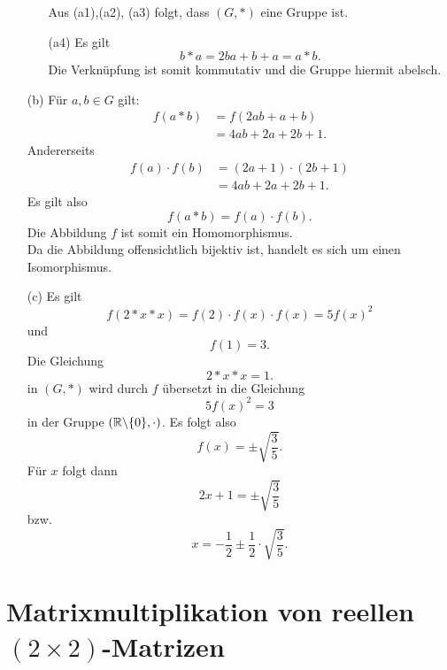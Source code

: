 \documentclass[
				a4paper,
				10pt
			]
			{scrartcl}
\begin{document}
\begin{itemize}
\begin{itemize}
					Aus (a1),(a2), (a3) folgt, dass $(G,\ast)$ eine Gruppe ist.
			\item[(a4)] Es gilt
					$$
						b\ast a = 2ba + b + a = a \ast b.
					$$
					Die Verkn\"upfung ist somit kommutativ und die Gruppe hiermit abelsch.
		\end{itemize}
		
		\item[(b)]
			F\"ur $a,b \in G$ gilt:
			\begin{align*}
				f(a\ast b)	&=	f(2ab+a+b)	\\
						&=	4ab + 2a + 2b + 1. 
			\end{align*}
			Andererseits
			\begin{align*}
				f(a)\cdot f(b)	&= (2a+1)\cdot(2b+1)	\\
							&= 4ab + 2a + 2b + 1. 
			\end{align*}
			Es gilt also
			$$
				f(a \ast b) = f(a)\cdot f(b).
			$$
			Die Abbildung $f$ ist somit ein Homomorphismus. \\
			Da die Abbildung offensichtlich bijektiv ist, handelt es sich um einen Isomorphismus.
		\item[(c)]
			Es gilt
			$$
				f(2\ast x \ast x) = f(2)\cdot f(x) \cdot f(x) = 5f(x)^2
			$$ 
			und 
			$$
				f(1) = 3.
			$$
			Die Gleichung 
			$$
				2\ast x\ast x = 1.
			$$
			in $(G,\ast)$ wird durch $f$ \"ubersetzt in die Gleichung
			$$
				5f(x)^2 = 3
			$$			
			in der Gruppe $(\mathbb{R}\backslash\{0\},\cdot)$.
			Es folgt also
			$$
				f(x) = \pm \sqrt{ \frac{3}{5}}.
			$$
			F\"ur $x$ folgt dann
			$$
				2x+1 = \pm \sqrt{ \frac{3}{5}}
			$$
			bzw.
			$$
				x = -\frac{1}{2} \pm \frac{1}{2}\cdot \sqrt{ \frac{3}{5}}.
			$$
\end{itemize}

\newpage
\section{Matrixmultiplikation von reellen $(2\times 2)$-Matrizen}
\end{document}
